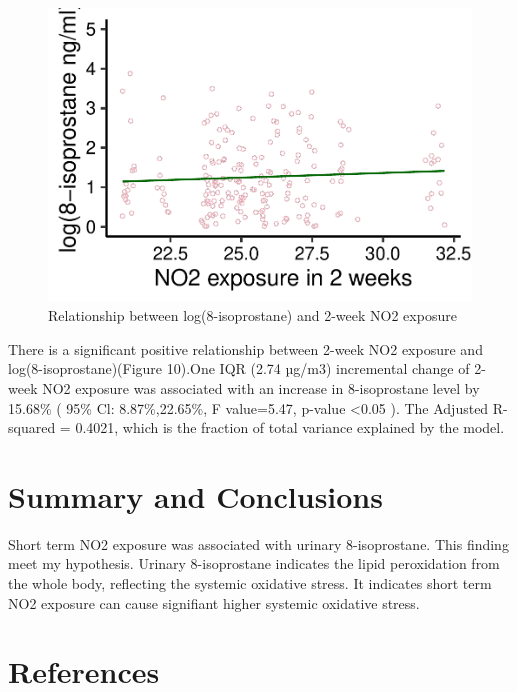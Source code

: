 \documentclass[12pt,]{article}
\begin{document}
\begin{figure}
\centering
\includegraphics{Wang_ENV872_Project_files/figure-latex/unnamed-chunk-13-1.pdf}
\caption{Relationship between log(8-isoprostane) and 2-week NO2
exposure}
\end{figure}

There is a significant positive relationship between 2-week NO2 exposure
and log(8-isoprostane)(Figure 10).One IQR (2.74 µg/m3) incremental
change of 2-week NO2 exposure was associated with an increase in
8-isoprostane level by 15.68\% ( 95\% Cl: 8.87\%,22.65\%, F value=5.47,
p-value \textless0.05 ). The Adjusted R-squared = 0.4021, which is the
fraction of total variance explained by the model.

\hypertarget{summary-and-conclusions}{%
\section{Summary and Conclusions}\label{summary-and-conclusions}}

Short term NO2 exposure was associated with urinary 8-isoprostane. This
finding meet my hypothesis. Urinary 8-isoprostane indicates the lipid
peroxidation from the whole body, reflecting the systemic oxidative
stress. It indicates short term NO2 exposure can cause signifiant higher
systemic oxidative stress.

\newpage

\hypertarget{references}{%
\section{References}\label{references}}
\end{document}
